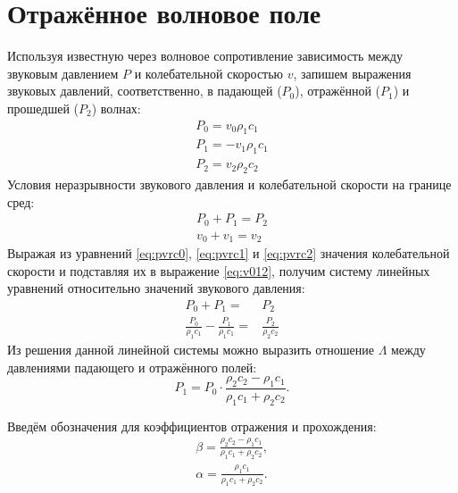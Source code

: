 \documentclass[a4paper, fontsize=14pt]{article}
\begin{document}
	\section{Отражённое волновое поле}
	Используя известную через волновое сопротивление зависимость между звуковым давлением $P$ и колебательной скоростью $v$, запишем выражения звуковых давлений, соответственно, в падающей ($P_0$), отражённой ($P_1$) и прошедшей ($P_2$) волнах: \cite{zakharov}
	\begin{eqnarray}
		P_0 = v_0 \rho_1 c_1 \label{eq:pvrc0} \\
		P_1 = - v_1 \rho_1 c_1 \label{eq:pvrc1}\\
		P_2 = v_2 \rho_2 c_2 \label{eq:pvrc2}
	\end{eqnarray}
	Условия неразрывности звукового давления и колебательной скорости на границе сред:
	\begin{eqnarray}
		P_0 + P_1 = P_2 \label{eq:p012}\\
		v_0 + v_1 = v_2 \label{eq:v012}
	\end{eqnarray}
	Выражая из уравнений \ref{eq:pvrc0}, \ref{eq:pvrc1} и \ref{eq:pvrc2} значения колебательной скорости и подставляя их в выражение \ref{eq:v012}, получим систему линейных уравнений относительно значений звукового давления:
	\begin{eqnarray}
		P_0 + P_1 =& P_2 \nonumber\\
		\frac{P_0}{\rho_1 c_1} - \frac{P_1}{\rho_1 c_1} =& \frac{P_2}{\rho_2 c_2} 
	\end{eqnarray}
	Из решения данной линейной системы можно выразить отношение $\Lambda$ между давлениями падающего и отражённого полей:
	\begin{equation}
		P_1 = P_0 \cdot \frac{\rho_2 c_2 - \rho_1 c_1}{\rho_1 c_1 + \rho_2 c_2 }.
		\label{eq:nreflratio}
	\end{equation}
	
	Введём обозначения для коэффициентов отражения и прохождения:
	\begin{gather}
		\beta =  \frac{\rho_2 c_2 - \rho_1 c_1}{\rho_1 c_1 + \rho_2 c_2 },\\
		\alpha =  \frac{\rho_1 c_1}{\rho_1 c_1 + \rho_2 c_2 }.
	\end{gather} 
	
\end{document}
